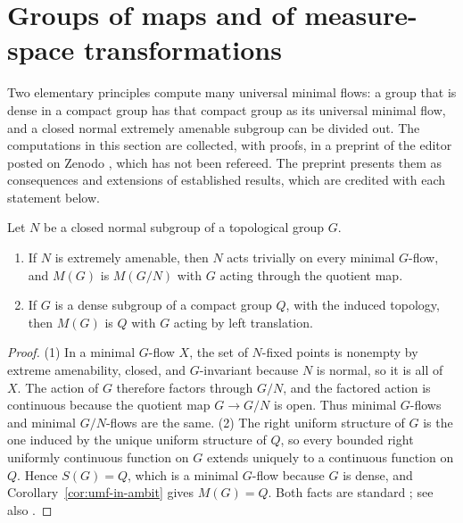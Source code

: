 \section{Groups of maps and of measure-space transformations}\label{sec:maps-transformations}

Two elementary principles compute many universal minimal flows: a group
that is dense in a compact group has that compact group as its universal
minimal flow, and a closed normal extremely amenable subgroup can be divided
out. The computations in this section are collected, with proofs, in a
preprint of the editor posted on Zenodo \cite{LupiniPointwise2026}, which has
not been refereed. The preprint presents them as consequences and extensions
of established results, which are credited with each statement below.

\begin{proposition}\label{prop:ea-normal}
Let $N$ be a closed normal subgroup of a topological group $G$.
\begin{enumerate}
\item If $N$ is extremely amenable, then $N$ acts trivially on every minimal
  $G$-flow, and $M(G)$ is $M(G/N)$ with $G$ acting through the quotient map.
\item If $G$ is a dense subgroup of a compact group $Q$, with the induced
  topology, then $M(G)$ is $Q$ with $G$ acting by left translation.
\end{enumerate}
\end{proposition}

\begin{proof}
(1) In a minimal $G$-flow $X$, the set of $N$-fixed points is nonempty by
extreme amenability, closed, and $G$-invariant because $N$ is normal, so it
is all of $X$. The action of $G$ therefore factors through $G/N$, and the
factored action is continuous because the quotient map $G\to G/N$ is open.
Thus minimal $G$-flows and minimal $G/N$-flows are the same. (2) The right
uniform structure of $G$ is the one induced by the unique uniform structure
of $Q$, so every bounded right uniformly continuous function on $G$ extends
uniquely to a continuous function on $Q$. Hence $S(G)=Q$, which is a minimal
$G$-flow because $G$ is dense, and Corollary~\ref{cor:umf-in-ambit} gives
$M(G)=Q$. Both facts are standard \cite{Pestov2006}; see also
\cite[Lemma~2.1]{LupiniPointwise2026}.
\end{proof}

